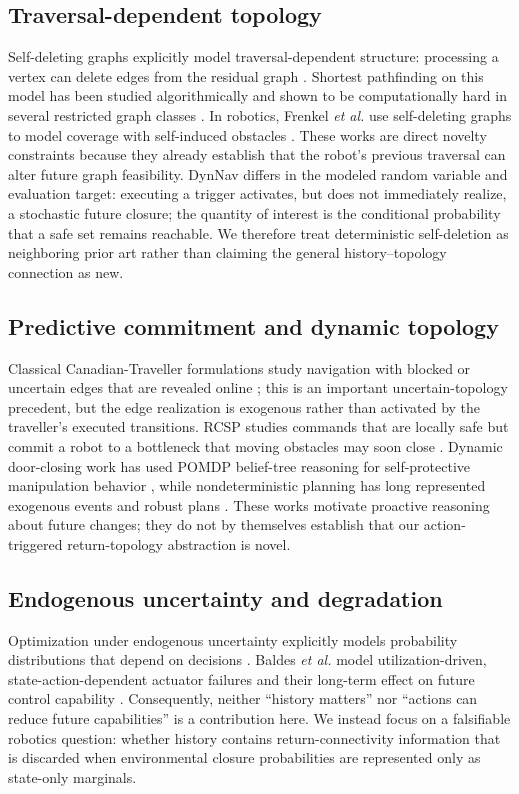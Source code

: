 \documentclass[conference]{IEEEtran}
\begin{document}
\subsection{Traversal-dependent topology}
Self-deleting graphs explicitly model traversal-dependent structure: processing a vertex can delete edges from the residual graph \cite{carmesin2023selfdeleting}. Shortest pathfinding on this model has been studied algorithmically and shown to be computationally hard in several restricted graph classes \cite{dvorak2025selfdeleting}. In robotics, Frenkel \emph{et al.} use self-deleting graphs to model coverage with self-induced obstacles \cite{frenkel2026selfinduced}. These works are direct novelty constraints because they already establish that the robot's previous traversal can alter future graph feasibility. DynNav differs in the modeled random variable and evaluation target: executing a trigger activates, but does not immediately realize, a stochastic future closure; the quantity of interest is the conditional probability that a safe set remains reachable. We therefore treat deterministic self-deletion as neighboring prior art rather than claiming the general history--topology connection as new.

\subsection{Predictive commitment and dynamic topology}
Classical Canadian-Traveller formulations study navigation with blocked or uncertain edges that are revealed online \cite{papadimitriou1991shortest}; this is an important uncertain-topology precedent, but the edge realization is exogenous rather than activated by the traveller's executed transitions.
RCSP studies commands that are locally safe but commit a robot to a bottleneck that moving obstacles may soon close \cite{han2026rcsp}. Dynamic door-closing work has used POMDP belief-tree reasoning for self-protective manipulation behavior \cite{liu2021door}, while nondeterministic planning has long represented exogenous events and robust plans \cite{perret1996events}. These works motivate proactive reasoning about future changes; they do not by themselves establish that our action-triggered return-topology abstraction is novel.

\subsection{Endogenous uncertainty and degradation}
Optimization under endogenous uncertainty explicitly models probability distributions that depend on decisions \cite{doan2022endogenous}. Baldes \emph{et al.} model utilization-driven, state-action-dependent actuator failures and their long-term effect on future control capability \cite{baldes2024fallible}. Consequently, neither ``history matters'' nor ``actions can reduce future capabilities'' is a contribution here. We instead focus on a falsifiable robotics question: whether history contains return-connectivity information that is discarded when environmental closure probabilities are represented only as state-only marginals.
\end{document}
